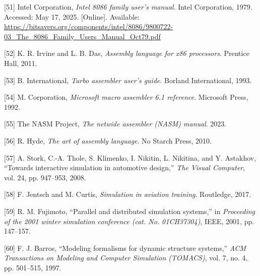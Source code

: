 \documentclass[12pt,oneside]{templates/unerthesis}
\newcommand{\CSLLeftMargin}[1]{#1} %
\newcommand{\CSLRightInline}[1]{#1} %
\newlength{\cslhangindent}
\newenvironment{CSLReferences}[2] %
 {\setlength{\parindent}{0pt}%
  \setlength{\leftskip}{#1 pt\relax}%
  \setlength{\parskip}{#2 pt\relax}%
  \everypar{\setlength{\hangindent}{\cslhangindent}}}
 {\par}
\begin{document}
\begin{CSLReferences}{0}{0}
\leavevmode{}%
\CSLLeftMargin{{[}51{]} }%
\CSLRightInline{Intel Corporation, \emph{Intel 8086 family user's manual}. Intel Corporation, 1979. Accessed: May 17, 2025. {[}Online{]}. Available: \url{https://bitsavers.org/components/intel/8086/9800722-03_The_8086_Family_Users_Manual_Oct79.pdf}}

\leavevmode{}%
\CSLLeftMargin{{[}52{]} }%
\CSLRightInline{K. R. Irvine and L. B. Das, \emph{Assembly language for x86 processors}. Prentice Hall, 2011.}

\leavevmode{}%
\CSLLeftMargin{{[}53{]} }%
\CSLRightInline{B. International, \emph{Turbo assembler user's guide}. Borland International, 1993.}

\leavevmode{}%
\CSLLeftMargin{{[}54{]} }%
\CSLRightInline{M. Corporation, \emph{Microsoft macro assembler 6.1 reference}. Microsoft Press, 1992.}

\leavevmode{}%
\CSLLeftMargin{{[}55{]} }%
\CSLRightInline{The NASM Project, \emph{The netwide assembler (NASM) manual}. 2023.}

\leavevmode{}%
\CSLLeftMargin{{[}56{]} }%
\CSLRightInline{R. Hyde, \emph{The art of assembly language}. No Starch Press, 2010.}

\leavevmode{}%
\CSLLeftMargin{{[}57{]} }%
\CSLRightInline{A. Stork, C.-A. Thole, S. Klimenko, I. Nikitin, L. Nikitina, and Y. Astakhov, {``Towards interactive simulation in automotive design,''} \emph{The Visual Computer}, vol. 24, pp. 947--953, 2008.}

\leavevmode{}%
\CSLLeftMargin{{[}58{]} }%
\CSLRightInline{F. Jentsch and M. Curtis, \emph{Simulation in aviation training}. Routledge, 2017.}

\leavevmode{}%
\CSLLeftMargin{{[}59{]} }%
\CSLRightInline{R. M. Fujimoto, {``Parallel and distributed simulation systems,''} in \emph{Proceeding of the 2001 winter simulation conference (cat. No. 01CH37304)}, IEEE, 2001, pp. 147--157.}

\leavevmode{}%
\CSLLeftMargin{{[}60{]} }%
\CSLRightInline{F. J. Barros, {``Modeling formalisms for dynamic structure systems,''} \emph{ACM Transactions on Modeling and Computer Simulation (TOMACS)}, vol. 7, no. 4, pp. 501--515, 1997.}


\end{CSLReferences}
\end{document}
